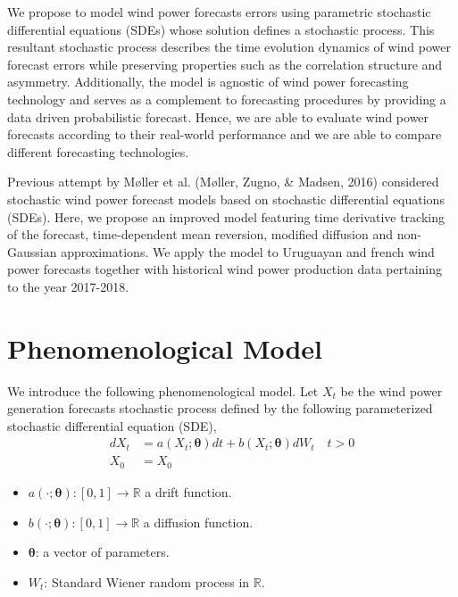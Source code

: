 \documentclass[10pt,twocolumn,letterpaper]{article}
\newcommand{\R}{\mathbb{R}}
\begin{document}
We propose to model wind power forecasts errors using parametric stochastic differential equations (SDEs) whose solution defines a stochastic process. This resultant stochastic process describes the time evolution dynamics of wind power forecast errors while preserving properties such as the correlation structure and asymmetry. Additionally, the model is agnostic of  wind power forecasting technology and serves as a complement to forecasting procedures by providing a data driven probabilistic forecast. Hence, we are able to evaluate wind power forecasts according to their real-world performance and we are able to compare different forecasting technologies.

Previous attempt by M\o ller et al. (M\o ller, Zugno, \& Madsen, 2016)  considered stochastic wind power forecast models based on stochastic differential equations (SDEs). Here, we propose an improved model featuring time derivative tracking of the forecast, time-dependent mean reversion, modified diffusion and non-Gaussian approximations. We apply the model to Uruguayan and french wind power forecasts together with historical wind power production data pertaining to the year 2017-2018.

\section{Phenomenological  Model}
We introduce the following phenomenological model. Let $X_t$ be the  wind power generation forecasts stochastic process defined by the  following parameterized stochastic differential equation (SDE),
\begin{equation}
\begin{split}
dX_t &= a(X_t; \bm{\theta}) dt + b (X_t; \bm{\theta} ) dW_t \quad t > 0 \\
X_0 & = X_0
\end{split}
\label{main}
\end{equation}

\begin{itemize}
\item $a(\cdot; \bm{\theta}):[0,1] \to \R $  a drift function.
\item $b (\cdot; \bm{\theta} ):[0,1] \to \R$  a  diffusion function.
\item $\bm{\theta}$: a vector of parameters.
\item $W_t$: Standard Wiener random process in $\R$.
\end{itemize}
\end{document}
